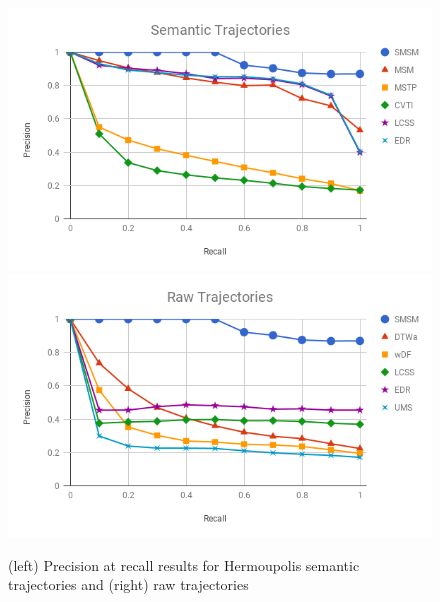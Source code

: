 \documentclass[12pt]{article}
\begin{document}
\begin{figure}[ht!]
\centerline{
\centering
\includegraphics[width=.45\textwidth]{Images/P_R-chart_Hermoupolis_semantic.png}
\includegraphics[width=.45\textwidth]{Images/P_R-chart_Hermoupolis_raw.png}
}
\caption{(left) Precision at recall results for Hermoupolis semantic trajectories  and (right) raw  trajectories}
\label{fig:hermoupolis_precision_recall}
\end{figure}


 
\end{document}
